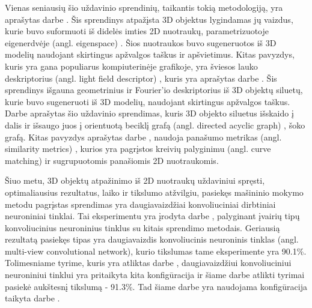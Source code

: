 Vienas seniausių šio uždavinio sprendinių, taikantis tokią metodologiją, yra aprašytas darbe \cite{prevWparEig}. Šis sprendinys atpažįsta 3D objektus lygindamas jų vaizdus, kurie buvo suformuoti iš didelės imties 2D nuotraukų, parametrizuotoje 
eigenerdvėje (angl. eigenspace) %
. Šios nuotraukos buvo sugeneruotos iš 3D modelių naudojant skirtingus apžvalgos taškus ir apšvietimus. 
Kitas pavyzdys, kuris yra gana populiarus kompiuterinėje grafikoje, yra 
šviesos lauko deskriptorius (angl. light field descriptor)%
, kuris yra aprašytas darbe \cite{prevWLightFld}. Šis sprendinys išgauna geometrinius ir 
Fourier'io %
deskriptorius iš 3D objektų siluetų, kurie buvo sugeneruoti iš 3D modelių, naudojant skirtingus apžvalgos taškus. 
Darbe \cite{prevWShockGraph} aprašytas šio uždavinio sprendimas, kuris 3D objekto siluetus išskaido į dalis ir išsaugo juos į 
orientuotą beciklį grafą (angl. directed acyclic graph) %
, šoko grafą. %
Kitas pavyzdys aprašytas darbe \cite{prevWSimMet}, naudoja panašumo metrikas (angl. similarity metrics) %
, kurios yra pagrįstos kreivių palyginimu (angl. curve matching)%
ir sugrupuotomis panašiomis 2D nuotraukomis.

Šiuo metu, 3D objektų atpažinimo iš 2D nuotraukų uždaviniui spręsti, optimaliausius  rezultatus, laiko ir tikslumo atžvilgiu, pasiekęs mašininio mokymo metodu pagrįstas sprendimas yra daugiavaizdžiai konvoliuciniai dirbtiniai neuroniniai tinklai. Tai eksperimentu yra įrodyta darbe \cite{cnnExp1}, palyginant įvairių tipų konvoliucinius neuroninius tinklus su kitais sprendimo metodais. Geriausią rezultatą pasiekęs tipas yra daugiavaizdis konvoliucinis neuroninis tinklas (angl. multi-view convolutional network), kurio tikslumas tame eksperimente yra 90.1\%. Tolimesniame tyrime, kuris yra atliktas darbe \cite{cnnExp2}, daugiavaizdžiui konvoliuciniui neuroniniui tinklui yra pritaikyta kita konfigūracija ir šiame darbe atlikti tyrimai pasiekė aukštesnį tikslumą - 91.3\%. Tad šiame darbe yra naudojama konfigūracija taikyta darbe \cite{cnnExp2}.